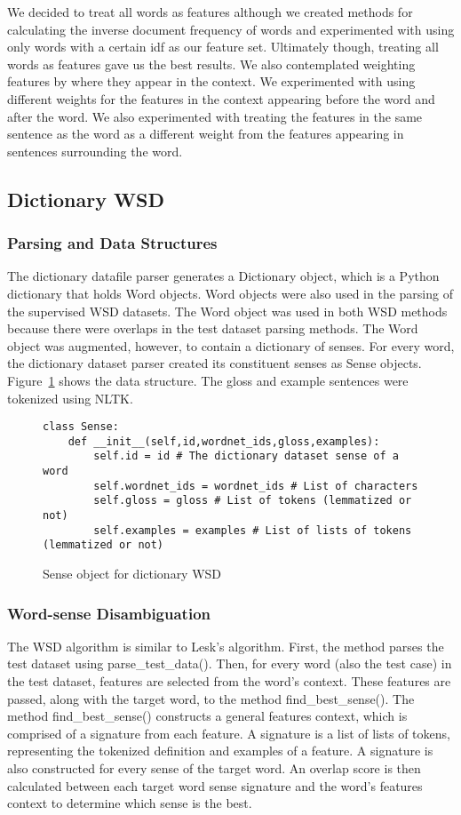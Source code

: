 \documentclass[11pt]{article}
\begin{document}
We decided to treat all words as features although we created methods for calculating the inverse document frequency of words and experimented with using only words with a certain idf as our feature set. Ultimately though, treating all words as features gave us the best results. We also contemplated weighting features by where they appear in the context. We experimented with using different weights for the features in the context appearing before the word and after the word. We also experimented with treating the features in the same sentence as the word as a different weight from the features appearing in sentences surrounding the word.

\subsection{Dictionary WSD}
\subsubsection{Parsing and Data Structures}
The dictionary datafile parser generates a Dictionary object, which is a Python dictionary that holds Word objects. Word objects were also used in the parsing of the supervised WSD datasets. The Word object was used in both WSD methods because there were overlaps in the test dataset parsing methods. The Word object was augmented, however, to contain a dictionary of senses. For every word, the dictionary dataset parser created its constituent senses as Sense objects. Figure~\ref{sense} shows the data structure. The gloss and example sentences were tokenized using NLTK.

\begin{figure}[ht]
\begin{lstlisting}
class Sense:
    def __init__(self,id,wordnet_ids,gloss,examples):
        self.id = id # The dictionary dataset sense of a word
        self.wordnet_ids = wordnet_ids # List of characters
        self.gloss = gloss # List of tokens (lemmatized or not)
        self.examples = examples # List of lists of tokens (lemmatized or not)
\end{lstlisting}
\caption{Sense object for dictionary WSD}
\label{sense}
\end{figure}

\subsubsection{Word-sense Disambiguation}
The WSD algorithm is similar to Lesk's algorithm. First, the method parses the test dataset using parse\_test\_data(). Then, for every word (also the test case) in the test dataset, features are selected from the word's context. These features are passed, along with the target word, to the method find\_best\_sense(). The method find\_best\_sense() constructs a general features context, which is comprised of a signature from each feature. A signature is a list of lists of tokens, representing the tokenized definition and examples of a feature. A signature is also constructed for every sense of the target word. An overlap score is then calculated between each target word sense signature and the word's features context to determine which sense is the best. 
\end{document}
